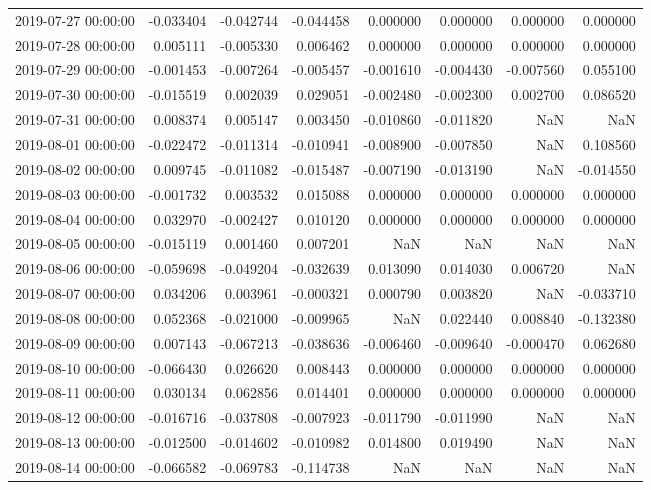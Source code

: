 \begin{tabular}{lrrrrrrr}
2019-07-27 00:00:00 & -0.033404 & -0.042744 & -0.044458 & 0.000000 & 0.000000 & 0.000000 & 0.000000 \\
2019-07-28 00:00:00 & 0.005111 & -0.005330 & 0.006462 & 0.000000 & 0.000000 & 0.000000 & 0.000000 \\
2019-07-29 00:00:00 & -0.001453 & -0.007264 & -0.005457 & -0.001610 & -0.004430 & -0.007560 & 0.055100 \\
2019-07-30 00:00:00 & -0.015519 & 0.002039 & 0.029051 & -0.002480 & -0.002300 & 0.002700 & 0.086520 \\
2019-07-31 00:00:00 & 0.008374 & 0.005147 & 0.003450 & -0.010860 & -0.011820 & NaN & NaN \\
2019-08-01 00:00:00 & -0.022472 & -0.011314 & -0.010941 & -0.008900 & -0.007850 & NaN & 0.108560 \\
2019-08-02 00:00:00 & 0.009745 & -0.011082 & -0.015487 & -0.007190 & -0.013190 & NaN & -0.014550 \\
2019-08-03 00:00:00 & -0.001732 & 0.003532 & 0.015088 & 0.000000 & 0.000000 & 0.000000 & 0.000000 \\
2019-08-04 00:00:00 & 0.032970 & -0.002427 & 0.010120 & 0.000000 & 0.000000 & 0.000000 & 0.000000 \\
2019-08-05 00:00:00 & -0.015119 & 0.001460 & 0.007201 & NaN & NaN & NaN & NaN \\
2019-08-06 00:00:00 & -0.059698 & -0.049204 & -0.032639 & 0.013090 & 0.014030 & 0.006720 & NaN \\
2019-08-07 00:00:00 & 0.034206 & 0.003961 & -0.000321 & 0.000790 & 0.003820 & NaN & -0.033710 \\
2019-08-08 00:00:00 & 0.052368 & -0.021000 & -0.009965 & NaN & 0.022440 & 0.008840 & -0.132380 \\
2019-08-09 00:00:00 & 0.007143 & -0.067213 & -0.038636 & -0.006460 & -0.009640 & -0.000470 & 0.062680 \\
2019-08-10 00:00:00 & -0.066430 & 0.026620 & 0.008443 & 0.000000 & 0.000000 & 0.000000 & 0.000000 \\
2019-08-11 00:00:00 & 0.030134 & 0.062856 & 0.014401 & 0.000000 & 0.000000 & 0.000000 & 0.000000 \\
2019-08-12 00:00:00 & -0.016716 & -0.037808 & -0.007923 & -0.011790 & -0.011990 & NaN & NaN \\
2019-08-13 00:00:00 & -0.012500 & -0.014602 & -0.010982 & 0.014800 & 0.019490 & NaN & NaN \\
2019-08-14 00:00:00 & -0.066582 & -0.069783 & -0.114738 & NaN & NaN & NaN & NaN \\

\end{tabular}
